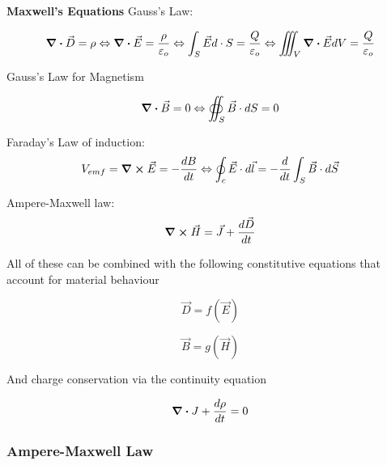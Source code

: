 \documentclass[10pt]{article}
\begin{document}
\begin{theorem}
	\textbf{Maxwell's Equations} 
	Gauss's Law:

	\begin{equation}
		\divergence \vec{D} = \rho  \Leftrightarrow \divergence \vec{E}= \frac{\rho}{\varepsilon_o} \Leftrightarrow \int_S \vec{E} d\cdot S = \frac{Q}{\varepsilon_o} \Leftrightarrow \iiint_V \divergence \vec{E} dV = \frac{Q}{\varepsilon_o} 
		\label{eq:259:gauss_law}
	\end{equation}

	Gauss's Law for Magnetism

	\begin{equation}
		\divergence \vec{B} = 0 \Leftrightarrow \oiint_S \vec{B} \cdot  dS = 0
		\label{eq:259:gauss_law_magnetism}
	\end{equation}

	Faraday's Law of induction:
	\begin{equation}
		V_{emf} = \curl \vec{E} = - \frac{dB}{dt} \Leftrightarrow \oint_c  \vec{E} \cdot d \vec{l} = - \frac{d}{dt} \int_S \vec{B} \cdot d \vec{S}
		\label{eq:259:faraday_law_induction}
	\end{equation}

	Ampere-Maxwell law:
	\begin{equation}
		\curl \vec{H} = \vec{J} + \frac{d\vec{D}}{dt}
		\label{eq:259:ampere_maxwell}
	\end{equation}

	All of these can be combined with the following constitutive equations that account for material behaviour

	\begin{equation}
		 \vec{D} = f(\vec{E})
	\end{equation}

	\begin{equation}
		\vec{B} = g(\vec{H})
	\end{equation}

	And charge conservation via the continuity equation

	\begin{equation}
		\divergence J + \frac{d\rho}{dt} = 0
	\end{equation}
	

\end{theorem}





\subsubsection{Ampere-Maxwell Law}
\end{document}
